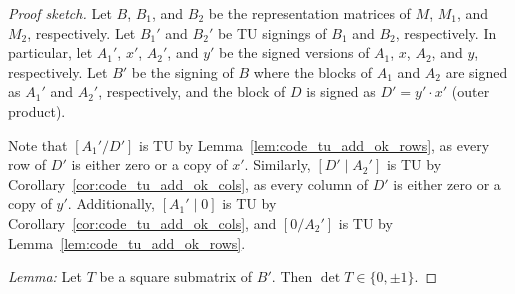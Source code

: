 \begin{proof}[Proof sketch]

  Let $B$, $B_{1}$, and $B_{2}$ be the representation matrices of $M$, $M_{1}$, and $M_{2}$, respectively.
  Let $B_{1}'$ and $B_{2}'$ be TU signings of $B_{1}$ and $B_{2}$, respectively.
  In particular, let $A_{1}'$, $x'$, $A_{2}'$, and $y'$ be the signed versions of $A_{1}$, $x$, $A_{2}$, and $y$, respectively.
  Let $B'$ be the signing of $B$ where the blocks of $A_{1}$ and $A_{2}$ are signed as $A_{1}'$ and $A_{2}'$, respectively, and the block of $D$ is signed as $D' = y' \cdot x'$ (outer product).

  Note that $\left[ A_{1}' / D' \right]$ is TU by Lemma~\ref{lem:code_tu_add_ok_rows}, as every row of $D'$ is either zero or a copy of $x'$.
  Similarly, $\left[D' \mid A_{2}' \right]$ is TU by Corollary~\ref{cor:code_tu_add_ok_cols}, as every column of $D'$ is either zero or a copy of $y'$.
  Additionally, $\left[ A_{1}' \mid 0 \right]$ is TU by Corollary~\ref{cor:code_tu_add_ok_cols}, and $\left[ 0 / A_{2}' \right]$ is TU by Lemma~\ref{lem:code_tu_add_ok_rows}.


  \emph{Lemma:} Let $T$ be a square submatrix of $B'$. Then $\det T \in \{0, \pm 1\}$.


\end{proof}

